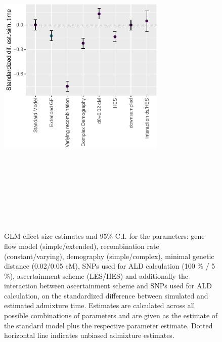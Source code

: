 \documentclass[11pt]{article}
\begin{document}
\begin{figure}
\centering
\includegraphics[width=8cm,height=16cm,keepaspectratio]{ATE_Revisions_files/figure-latex/figResult_3_supplements-1.pdf}
\caption{\label{fig:figS2_1} GLM effect size estimates and 95\% C.I. for the parameters: gene flow model (simple/extended), recombination rate (constant/varying), demography (simple/complex), minimal genetic distance (0.02/0.05 cM), SNPs used for ALD calculation (100 \% / 5 \%), ascertainment scheme (LES/HES) and additionally the interaction between ascertainment scheme and SNPs used for ALD calculation, on the standardized difference between simulated and estimated admixture time. Estimates are calculated across all possible combinations of parameters and are given as the estimate of the standard model plus the respective parameter estimate. Dotted horizontal line indicates unbiased admixture estimates.}
\end{figure}
\end{document}
